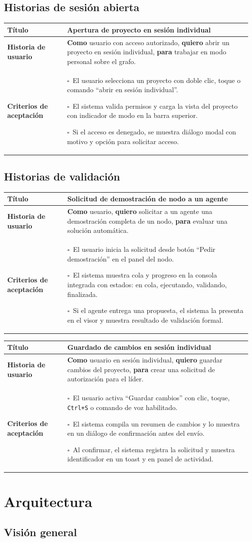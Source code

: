 \documentclass[12pt, letterpaper]{article}
\newcommand{\storycheck}[1]{\(\square\)~#1\par}
\newcommand{\story}[3]{%
\begin{table}[H]
    \centering
    \begingroup
    \arrayrulecolor{storyline}
    \setlength{\tabcolsep}{10pt}
    \renewcommand{\arraystretch}{1.55}
    \begin{tabularx}{\textwidth}{|>{\raggedright\arraybackslash\bfseries\columncolor{storyheaderbg}}p{3.4cm}|>{\raggedright\arraybackslash\columncolor{storycontentbg}}X|}
        \hline
        Título & #1 \\
        \hline
        Historia de usuario & #2 \\
        \hline
        Criterios de aceptación & #3 \\
        \hline
    \end{tabularx}
    \endgroup
\end{table}
}
\begin{document}
\subsection{Historias de sesión abierta}

\story
{Apertura de proyecto en sesión individual}
{\textbf{Como} usuario con acceso autorizado, \textbf{quiero} abrir un proyecto en sesión individual, \textbf{para} trabajar en modo personal sobre el grafo.}
{%
\storycheck{El usuario selecciona un proyecto con doble clic, toque o comando ``abrir en sesión individual''.}
\storycheck{El sistema valida permisos y carga la vista del proyecto con indicador de modo en la barra superior.}
\storycheck{Si el acceso es denegado, se muestra diálogo modal con motivo y opción para solicitar acceso.}}

\subsection{Historias de validación}

\story
{Solicitud de demostración de nodo a un agente}
{\textbf{Como} usuario, \textbf{quiero} solicitar a un agente una demostración completa de un nodo, \textbf{para} evaluar una solución automática.}
{%
\storycheck{El usuario inicia la solicitud desde botón ``Pedir demostración'' en el panel del nodo.}
\storycheck{El sistema muestra cola y progreso en la consola integrada con estados: en cola, ejecutando, validando, finalizada.}
\storycheck{Si el agente entrega una propuesta, el sistema la presenta en el visor y muestra resultado de validación formal.}}

\story
{Guardado de cambios en sesión individual}
{\textbf{Como} usuario en sesión individual, \textbf{quiero} guardar cambios del proyecto, \textbf{para} crear una solicitud de autorización para el líder.}
{%
\storycheck{El usuario activa ``Guardar cambios'' con clic, toque, \texttt{Ctrl+S} o comando de voz habilitado.}
\storycheck{El sistema compila un resumen de cambios y lo muestra en un diálogo de confirmación antes del envío.}
\storycheck{Al confirmar, el sistema registra la solicitud y muestra identificador en un toast y en panel de actividad.}}

\clearpage

\section{Arquitectura}

\subsection{Visión general}
\end{document}
